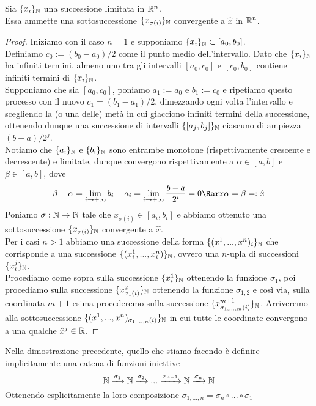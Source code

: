 \documentclass{article}
\begin{document}
\begin{theorem}{}{}
    Sia $\{x_i\}_{\mathbb{N}}$ una successione limitata in $\mathbb{R}^n$.\\
    Essa ammette una sottosuccessione $\{x_{\sigma(i)}\}_{\mathbb{N}}$ convergente a $\hat{x}$ in $\mathbb{R}^n$.
\end{theorem}
\begin{proof}
    Iniziamo con il caso $n=1$ e supponiamo $\{x_i\}_{\mathbb{N}} \subset [a_0,b_0]$.\\
    Definiamo $c_0 := (b_0 - a_0)/2$ come il punto medio dell'intervallo. Dato che $\{x_i\}_{\mathbb{N}}$ ha infiniti termini, almeno uno tra gli intervalli $[a_0, c_0]$ e $[c_0, b_0]$ contiene infiniti termini di $\{x_i\}_{\mathbb{N}}$.\\
    Supponiamo che sia $[a_0,c_0]$, poniamo $a_1 := a_0$ e $b_1:= c_0$ e ripetiamo questo processo con il nuovo $c_1 = (b_1 - a_1)/2$, dimezzando ogni volta l'intervallo e scegliendo la (o una delle) metà in cui giacciono infiniti termini della successione, ottenendo dunque una successione di intervalli $\{[a_j, b_j]\}_{\mathbb{N}}$ ciascuno di ampiezza $(b-a)/2^j$.\\
    Notiamo che $\{a_i\}_{\mathbb{N}}$ e $\{b_i\}_{\mathbb{N}}$ sono entrambe monotone (rispettivamente crescente e decrescente) e limitate, dunque convergono rispettivamente a $\alpha \in [a,b]$ e $\beta \in [a,b]$, dove 
    \[\beta - \alpha = \lim_{i\to+\infty}b_i - a_i = \lim_{i\to+\infty} \frac{b-a}{2^i} = 0 \Rarr \alpha = \beta=: \hat{x}\]
    Poniamo $\sigma:\mathbb{N} \to \mathbb{N}$ tale che $x_{\sigma(i)} \in [a_i, b_i]$ e abbiamo ottenuto una sottosuccessione $\{x_{\sigma(i)}\}_{\mathbb{N}}$ convergente a $\hat{x}$.\\
    Per i casi $n>1$ abbiamo una successione della forma $\{(x^1,...,x^n)_i\}_{\mathbb{N}}$ che corrisponde a una successione $\{(x^1_i,...,x^n_i)\}_{\mathbb{N}}$, ovvero una $n$-upla di successioni $\{x^j_i\}_{\mathbb{N}}$.\\
    Procediamo come sopra sulla successione $\{x^1_i\}_{\mathbb{N}}$ ottenendo la funzione $\sigma_1$, poi procediamo sulla successione $\{x^2_{\sigma_1(i)}\}_{\mathbb{N}}$ ottenendo la funzione $\sigma_{1,2}$ e così via, sulla coordinata $m+1$-esima procederemo sulla successione $\{x^{m+1}_{\sigma_{1,...,m}(i)}\}_{\mathbb{N}}$.
    Arriveremo alla sottosuccessione $\{(x^1,...,x^n)_{\sigma_{1,...,n}(i)}\}_{\mathbb{N}}$ in cui tutte le coordinate convergono a una qualche $\hat{x}^j \in \mathbb{R}$.
\end{proof}
\begin{remark}{}{}
    Nella dimostrazione precedente, quello che stiamo facendo è definire implicitamente una catena di funzioni iniettive
    \[\mathbb{N} \xrightarrow{\sigma_1} \mathbb{N} \xrightarrow{\sigma_{2}}... \xrightarrow{\sigma_{n-1}}\mathbb{N} \xrightarrow{\sigma_{n}} \mathbb{N}\]
    Ottenendo esplicitamente la loro composizione $\sigma_{1,...,n} = \sigma_n \circ ... \circ \sigma_1$
\end{remark}
\end{document}
